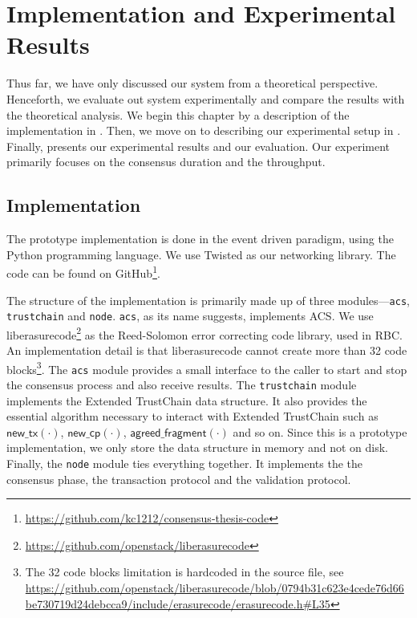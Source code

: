 \chapter{Implementation and Experimental Results}
\label{ch:implementation}

Thus far, we have only discussed our system from a theoretical perspective.
Henceforth, we evaluate out system experimentally and compare the results with the theoretical analysis.
We begin this chapter by a description of the implementation in .
Then, we move on to describing our experimental setup in .
Finally,  presents our experimental results and our evaluation.
Our experiment primarily focuses on the consensus duration and the throughput.


\section{Implementation}
\label{sec:implementation}

The prototype implementation is done in the event driven paradigm, using the Python programming language.
We use Twisted as our networking library.
The code can be found on GitHub\footnote{\url{https://github.com/kc1212/consensus-thesis-code}}.

The structure of the implementation is primarily made up of three modules---\texttt{acs}, \texttt{trustchain} and \texttt{node}.
\texttt{acs}, as its name suggests, implements ACS.
We use liberasurecode\footnote{\url{https://github.com/openstack/liberasurecode}} as the Reed-Solomon error correcting code library, used in RBC.
An implementation detail is that liberasurecode cannot create more than 32 code blocks\footnote{
  The 32 code blocks limitation is hardcoded in the source file, see
  \url{https://github.com/openstack/liberasurecode/blob/0794b31c623e4cede76d66be730719d24debcca9/include/erasurecode/erasurecode.h#L35}
}.
The \texttt{acs} module provides a small interface to the caller to start and stop the consensus process and also receive results.
The \texttt{trustchain} module implements the Extended TrustChain data structure.
It also provides the essential algorithm necessary to interact with Extended TrustChain such as 
$\textsf{new\_tx}(\cdot)$, $\textsf{new\_cp}(\cdot)$, $\textsf{agreed\_fragment}(\cdot)$ and so on.
Since this is a prototype implementation, we only store the data structure in memory and not on disk.
Finally, the \texttt{node} module ties everything together.
It implements the the consensus phase, the transaction protocol and the validation protocol.

